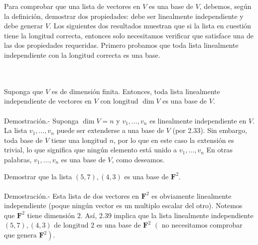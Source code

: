 Para comprobar que una lista de vectores en $V$ es una base de $V$, debemos, según la definición, demostrar dos propiedades: debe ser linealmente independiente y debe generar $V$. Los siguientes dos resultados muestran que si la lista en cuestión tiene la longitud correcta, entonces solo necesitamos verificar que satisface una de las dos propiedades requeridas. Primero probamos que toda lista linealmente independiente con la longitud correcta es una base.

\begin{myteo}\,\\\\
    Suponga que $V$ es de dimensión finita. Entonces, toda lista linealmente independiente de vectores en $V$ con longitud $\dim V$ es una base de $V$.\\\\
	Demostración.-\; Suponga $\dim V=n$ y $v_1,\ldots,v_n$ es linealmente independiente en $V$. La lista $v_1,\ldots,v_n$ puede ser extenderse a una base de $V$ (por 2.33). Sin embargo, toda base de $V$ tiene una longitud $n$, por lo que en este caso la extensión es trivial, lo que significa que ningún elemento está unido a $v_1,\ldots, v_n$ En otras palabras, $v_1,\ldots, v_n$ es una base de $V$, como deseamos.
\end{myteo}

\begin{myejem}
    Demostrar que la lista $(5,7),(4,3)$ es una base de $\textbf{F}^2$.\\\\
	Demostración.-\; Esta lista de dos vectores en $\textbf{F}^2$ es obviamente linealmente independiente (poque ningún vector es un multiplo escalar del otro). Notemos que $\textbf{F}^2$ tiene dimensión $2$. Así, 2.39 implica que la lista linealmente independiente $(5,7),(4,3)$ de longitud $2$ es una base de $\textbf{F}^2$ $\left(\right.$ no necesitamos comprobar que genera $\left.\textbf{F}^2\right)$. 
\end{myejem}

